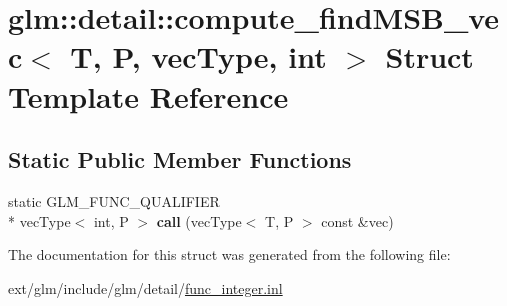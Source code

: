 \hypertarget{structglm_1_1detail_1_1compute__find_m_s_b__vec}{\section{glm\-:\-:detail\-:\-:compute\-\_\-find\-M\-S\-B\-\_\-vec$<$ T, P, vec\-Type, int $>$ Struct Template Reference}
\label{structglm_1_1detail_1_1compute__find_m_s_b__vec}
}
\subsection*{Static Public Member Functions}
\begin{DoxyCompactItemize}
\item 
\hypertarget{structglm_1_1detail_1_1compute__find_m_s_b__vec_a9ea90d2230763f80ab30465fc3a73a65}{static G\-L\-M\-\_\-\-F\-U\-N\-C\-\_\-\-Q\-U\-A\-L\-I\-F\-I\-E\-R \\*
vec\-Type$<$ int, P $>$ {\bfseries call} (vec\-Type$<$ T, P $>$ const \&vec)}\label{structglm_1_1detail_1_1compute__find_m_s_b__vec_a9ea90d2230763f80ab30465fc3a73a65}

\end{DoxyCompactItemize}


The documentation for this struct was generated from the following file\-:\begin{DoxyCompactItemize}
\item 
ext/glm/include/glm/detail/\hyperlink{func__integer_8inl}{func\-\_\-integer.\-inl}\end{DoxyCompactItemize}
